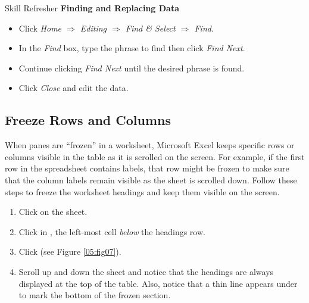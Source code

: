 \begin{center}
	\begin{sklbox}{Skill Refresher}
		\textbf{Finding and Replacing Data}
		\\
		\begin{itemize}
			\setlength{\itemsep}{0pt}
			\setlength{\parskip}{0pt}
			\setlength{\parsep}{0pt}

			\item Click \textit{Home $ \Rightarrow $ Editing $ \Rightarrow $ Find \& Select $ \Rightarrow $ Find}.
			\item In the \textit{Find} box, type the phrase to find then click \textit{Find Next}.
			\item Continue clicking \textit{Find Next} until the desired phrase is found.
			\item Click \textit{Close} and edit the data.
			
		\end{itemize}
	\end{sklbox}
\end{center}

\subsection{Freeze Rows and Columns}

When panes are ``frozen'' in a worksheet, Microsoft Excel keeps specific rows or columns visible in the table as it is scrolled on the screen. For example, if the first row in the spreadsheet contains labels, that row might be frozen to make sure that the column labels remain visible as the sheet is scrolled down. Follow these steps to freeze the worksheet headings and keep them visible on the screen.

\begin{enumbox}
	\begin{enumerate}
		\item Click on the  sheet.
		\item Click in , the left-most cell \textit{below} the headings row.
		\item Click  (see Figure \ref{05:fig07}).
		\item Scroll up and down the sheet and notice that the headings are always displayed at the top of the table. Also, notice that a thin line appears under  to mark the bottom of the frozen section.
	\end{enumerate}
\end{enumbox}
	
